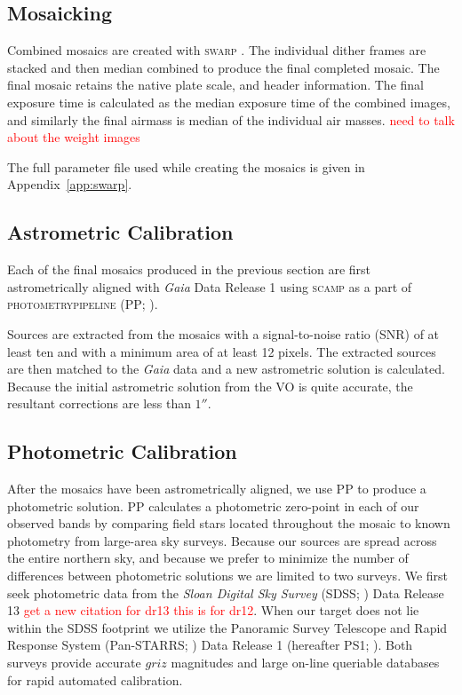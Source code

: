 \documentclass[apj, revtex4]{emulateapj}
\newcommand{\editorial}[1]{\textcolor{red}{#1}}
\begin{document}
\subsection{Mosaicking}
Combined mosaics are created with \textsc{swarp} \citep{Bertin2002}. The individual dither frames are stacked and then median combined to produce the final completed mosaic. The final mosaic retains the native plate scale, and header information. The final exposure time is calculated as the median exposure time of the combined images, and similarly the final airmass is median of the individual air masses. \editorial{need to talk about the weight images}

The full parameter file used while creating the mosaics is given in Appendix~\ref{app:swarp}.

\subsection{Astrometric Calibration}
Each of the final mosaics produced in the previous section are first astrometrically aligned with \textit{Gaia} \citep{GaiaCollaboration2016} Data Release 1 \citep{GaiaCollaboration2016a} using \textsc{scamp} \citep{Bertin2006} as a part of \textsc{photometrypipeline} (PP; \citealt{Mommert2017}).

Sources are extracted from the mosaics with a signal-to-noise ratio (SNR) of at least ten and with a minimum area of at least 12 pixels. The extracted sources are then matched to the \textit{Gaia} data and a new astrometric solution is calculated. Because the initial astrometric solution from the VO is quite accurate, the resultant corrections are less than $1''$.

\subsection{Photometric Calibration}
After the mosaics have been astrometrically aligned, we use PP to produce a photometric solution. PP calculates a photometric zero-point in each of our observed bands by comparing field stars located throughout the mosaic to known photometry from large-area sky surveys. Because our sources are spread across the entire northern sky, and because we prefer to minimize the number of differences between photometric solutions we are limited to two surveys. We first seek photometric data from the \textit{Sloan Digital Sky Survey} (SDSS; \citealt{York2000}) Data Release 13 \citep{Alam2015} \editorial{get a new citation for dr13 this is for dr12}. When our target does not lie within the SDSS footprint we utilize the Panoramic Survey Telescope and Rapid Response System (Pan-STARRS; \citealt{Chambers2016}) Data Release 1 (hereafter PS1; \citealt{Flewelling2016}). Both surveys provide accurate $griz$ magnitudes and large on-line queriable databases for rapid automated calibration.
\end{document}

